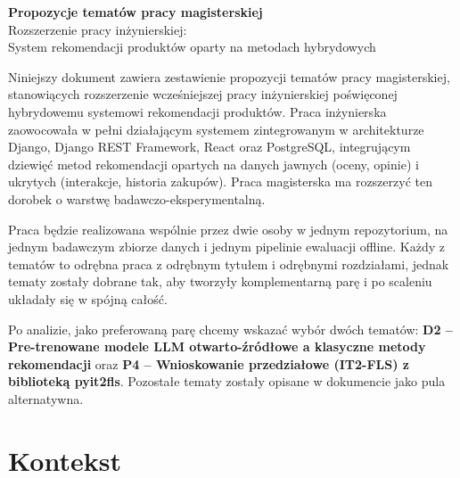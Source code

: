 \documentclass[12pt,a4paper]{article}
\begin{document}
\begin{titlepage}
\null\vspace*{4cm}
\begin{center}
{\color{primary}\Huge\bfseries Propozycje tematów pracy magisterskiej}\\[1.2em]
{\color{greytxt}\Large Rozszerzenie pracy inżynierskiej:}\\[0.3em]
{\color{greytxt}\Large System rekomendacji produktów oparty na metodach hybrydowych}
\end{center}

\vspace{2.5cm}

Niniejszy dokument zawiera zestawienie propozycji tematów pracy magisterskiej, stanowiących rozszerzenie wcześniejszej pracy inżynierskiej poświęconej hybrydowemu systemowi rekomendacji produktów. Praca inżynierska zaowocowała w pełni działającym systemem zintegrowanym w architekturze Django, Django REST Framework, React oraz PostgreSQL, integrującym dziewięć metod rekomendacji opartych na danych jawnych (oceny, opinie) i ukrytych (interakcje, historia zakupów). Praca magisterska ma rozszerzyć ten dorobek o warstwę badawczo-eksperymentalną.

Praca będzie realizowana wspólnie przez dwie osoby w jednym repozytorium, na jednym badawczym zbiorze danych i jednym pipelinie ewaluacji offline. Każdy z tematów to odrębna praca z odrębnym tytułem i odrębnymi rozdziałami, jednak tematy zostały dobrane tak, aby tworzyły komplementarną parę i po scaleniu układały się w spójną całość.

Po analizie, jako preferowaną parę chcemy wskazać wybór dwóch tematów: \newline\textbf{D2 -- Pre-trenowane modele LLM otwarto-źródłowe a klasyczne metody rekomendacji} oraz \textbf{P4 -- Wnioskowanie przedziałowe (IT2-FLS) z biblioteką pyit2fls}. Pozostałe tematy zostały opisane w dokumencie jako pula alternatywna.

\end{titlepage}

\section{Kontekst}
\end{document}
